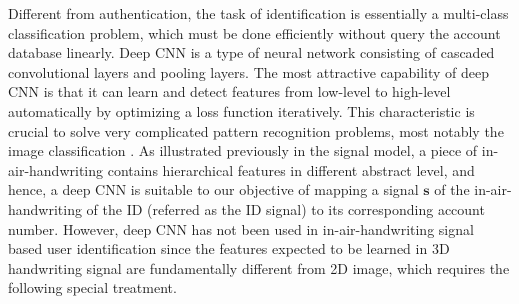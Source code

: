 \documentclass[conference]{IEEEtran}
\begin{document}
Different from authentication, the task of identification is essentially a multi-class classification problem, which must be done efficiently without query the account database linearly. Deep CNN is a type of neural network consisting of cascaded convolutional layers and pooling layers. The most attractive capability of deep CNN is that it can learn and detect features from low-level to high-level automatically by optimizing a loss function iteratively. This characteristic is crucial to solve very complicated pattern recognition problems, most notably the image classification \cite{krizhevsky2012imagenet, he2016deep, chollet2016xception}. As illustrated previously in the signal model, a piece of in-air-handwriting contains hierarchical features in different abstract level, and hence, a deep CNN is suitable to our objective of mapping a signal $\mathbf{s}$ of the in-air-handwriting of the ID (referred as the ID signal) to its corresponding account number. However, deep CNN has not been used in in-air-handwriting signal based user identification since the features expected to be learned in 3D handwriting signal are fundamentally different from 2D image, which requires the following special treatment.
\end{document}
